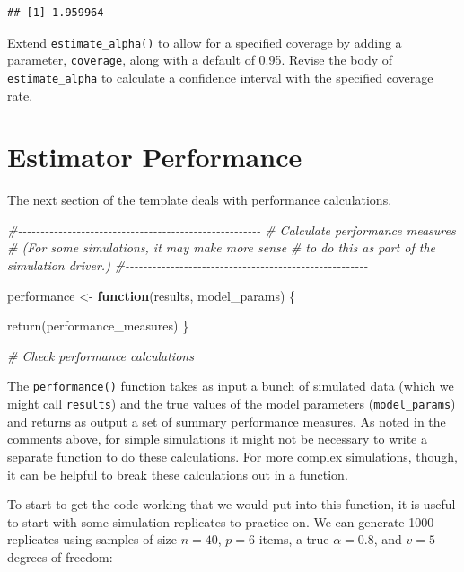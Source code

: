 \documentclass[
]{book}
\newenvironment{Shaded}{\begin{snugshade}}{\end{snugshade}}
\newcommand{\CommentTok}[1]{\textcolor[rgb]{0.56,0.35,0.01}{\textit{#1}}}
\newcommand{\ControlFlowTok}[1]{\textcolor[rgb]{0.13,0.29,0.53}{\textbf{#1}}}
\newcommand{\FunctionTok}[1]{\textcolor[rgb]{0.00,0.00,0.00}{#1}}
\newcommand{\NormalTok}[1]{#1}
\newcommand{\OtherTok}[1]{\textcolor[rgb]{0.56,0.35,0.01}{#1}}
\begin{document}
\begin{verbatim}
## [1] 1.959964
\end{verbatim}

Extend \texttt{estimate\_alpha()} to allow for a specified coverage by adding a parameter, \texttt{coverage}, along with a default of 0.95. Revise the body of \texttt{estimate\_alpha} to calculate a confidence interval with the specified coverage rate.

\hypertarget{estimator-performance}{%
\section{Estimator Performance}\label{estimator-performance}}

The next section of the template deals with performance calculations.

\begin{Shaded}
\begin{Highlighting}[]
\CommentTok{\#{-}{-}{-}{-}{-}{-}{-}{-}{-}{-}{-}{-}{-}{-}{-}{-}{-}{-}{-}{-}{-}{-}{-}{-}{-}{-}{-}{-}{-}{-}{-}{-}{-}{-}{-}{-}{-}{-}{-}{-}{-}{-}{-}{-}{-}{-}{-}{-}{-}{-}{-}{-}{-}{-}}
\CommentTok{\# Calculate performance measures}
\CommentTok{\# (For some simulations, it may make more sense}
\CommentTok{\# to do this as part of the simulation driver.)}
\CommentTok{\#{-}{-}{-}{-}{-}{-}{-}{-}{-}{-}{-}{-}{-}{-}{-}{-}{-}{-}{-}{-}{-}{-}{-}{-}{-}{-}{-}{-}{-}{-}{-}{-}{-}{-}{-}{-}{-}{-}{-}{-}{-}{-}{-}{-}{-}{-}{-}{-}{-}{-}{-}{-}{-}{-}}

\NormalTok{performance }\OtherTok{\textless{}{-}} \ControlFlowTok{function}\NormalTok{(results, model\_params) \{}

  \FunctionTok{return}\NormalTok{(performance\_measures)}
\NormalTok{\}}

\CommentTok{\# Check performance calculations}
\end{Highlighting}
\end{Shaded}

The \texttt{performance()} function takes as input a bunch of simulated data (which we might call \texttt{results}) and the true values of the model parameters (\texttt{model\_params}) and returns as output a set of summary performance measures. As noted in the comments above, for simple simulations it might not be necessary to write a separate function to do these calculations. For more complex simulations, though, it can be helpful to break these calculations out in a function.

To start to get the code working that we would put into this function, it is useful to start with some simulation replicates to practice on.
We can generate 1000 replicates using samples of size \(n = 40\), \(p = 6\) items, a true \(\alpha = 0.8\), and \(v = 5\) degrees of freedom:
\end{document}
